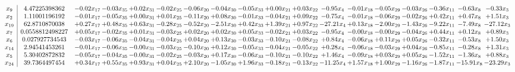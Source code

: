 \documentclass[9pt]{article}
\begin{document}
 \[\begin{array}{c| c c@{\hskip 2pt} c@{\hskip 2pt} c@{\hskip 2pt} c@{\hskip 2pt} c@{\hskip 2pt} c@{\hskip 2pt} c@{\hskip 2pt} c@{\hskip 2pt} c@{\hskip 2pt} c@{\hskip 2pt} c@{\hskip 2pt} c@{\hskip 2pt} c@{\hskip 2pt} c@{\hskip 2pt} c@{\hskip 2pt} c@{\hskip 2pt} }
 x_{9}   &  4.47225398362 & -0.02 x_{17} & -0.03 x_{35} & +  0.02 x_{31} & -0.02 x_{25} & -0.06 x_{20} & -0.04 x_{30} & -0.05 x_{33} & +  0.00 x_{21} & +  0.03 x_{22} & -0.95 x_{4} & -0.01 x_{18} & -0.05 x_{29} & -0.03 x_{26} & -0.36 x_{11} & -0.63 x_{8} & -0.33 x_{3}\\
 x_{2}   &  1.11001196192 & -0.01 x_{17} & -0.05 x_{35} & +  0.00 x_{31} & +  0.01 x_{25} & -0.11 x_{20} & +  0.08 x_{30} & -0.01 x_{33} & -0.04 x_{21} & +  0.09 x_{22} & -0.75 x_{4} & -0.01 x_{18} & -0.06 x_{29} & -0.02 x_{26} & +  0.42 x_{11} & +  0.47 x_{8} & +  1.51 x_{3}\\
 x_{19}   &  62.8710870038 & +  0.27 x_{17} & +  0.48 x_{35} & +  0.63 x_{31} & -0.28 x_{25} & -0.52 x_{20} & -2.51 x_{30} & +  0.42 x_{33} & +  1.39 x_{21} & +  0.97 x_{22} & -27.21 x_{4} & +  0.13 x_{18} & -2.00 x_{29} & -1.43 x_{26} & -9.22 x_{11} & -7.49 x_{8} & -27.12 x_{3}\\
 x_{7}   &  0.0558812498227 & +  0.05 x_{17} & -0.02 x_{35} & +  0.01 x_{31} & -0.03 x_{25} & +  0.02 x_{20} & +  0.02 x_{30} & +  0.05 x_{33} & -0.02 x_{21} & +  0.03 x_{22} & -0.95 x_{4} & -0.00 x_{18} & -0.00 x_{29} & -0.04 x_{26} & +  0.44 x_{11} & +  0.12 x_{8} & +  0.89 x_{3}\\
 x_{6}   &  0.027927734543 & -0.03 x_{17} & -0.06 x_{35} & -0.04 x_{31} & -0.04 x_{25} & +  0.04 x_{20} & +  0.13 x_{30} & -0.03 x_{33} & -0.10 x_{21} & -0.08 x_{22} & +  0.84 x_{4} & -0.06 x_{18} & +  0.11 x_{29} & +  0.05 x_{26} & -0.32 x_{11} & -0.53 x_{8} & +  1.50 x_{3}\\
 x_{14}   &  2.94541453261 & -0.01 x_{17} & -0.06 x_{35} & -0.00 x_{31} & -0.03 x_{25} & -0.10 x_{20} & +  0.12 x_{30} & -0.05 x_{33} & -0.04 x_{21} & -0.05 x_{22} & +  0.28 x_{4} & -0.06 x_{18} & -0.03 x_{29} & +  0.04 x_{26} & -0.85 x_{11} & -0.28 x_{8} & +  1.31 x_{3}\\
 x_{5}   &  5.30402872832 & -0.05 x_{17} & -0.04 x_{35} & -0.00 x_{31} & -0.02 x_{25} & -0.03 x_{20} & +  0.17 x_{30} & -0.06 x_{33} & -0.10 x_{21} & -0.10 x_{22} & +  1.46 x_{4} & -0.09 x_{18} & +  0.03 x_{29} & +  0.05 x_{26} & -1.52 x_{11} & -1.36 x_{8} & +  0.88 x_{3}\\
 x_{24}   &  39.7364497454 & +  0.34 x_{17} & +  0.55 x_{35} & +  0.93 x_{31} & +  0.04 x_{25} & +  2.10 x_{20} & -1.05 x_{30} & +  1.96 x_{33} & -0.18 x_{21} & -0.13 x_{22} & -11.25 x_{4} & +  1.57 x_{18} & +  1.00 x_{29} & -1.16 x_{26} & -1.87 x_{11} & -15.91 x_{8} & -23.29 x_{3}\\

\end{array}\]
\end{document}
